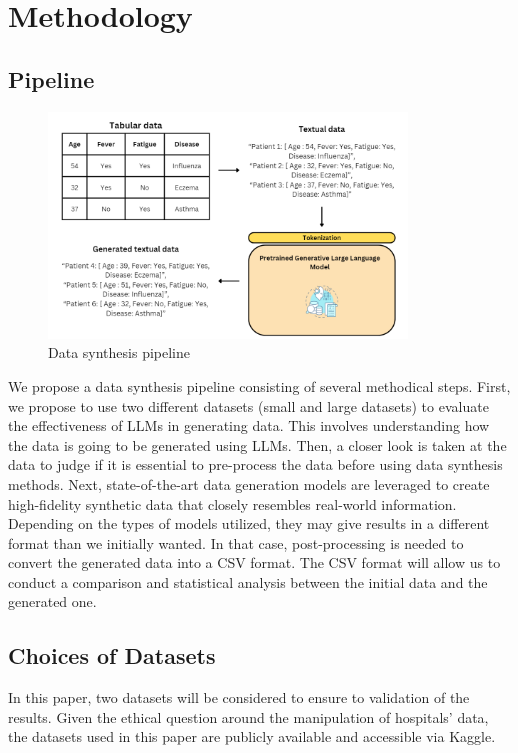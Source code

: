 \chapter{Methodology}

\section{Pipeline}

\begin{figure}[H]
    \centering
    \includegraphics[width=0.85\textwidth]{images/pipeline.png}
    \caption{Data synthesis pipeline}
    \label{fig:pipeline}
\end{figure}

We propose a data synthesis pipeline consisting of several methodical steps. First, we propose to use two different datasets (small and large datasets) to evaluate the effectiveness of LLMs in generating data. This involves understanding how the data is going to be generated using LLMs. Then, a closer look is taken at the data to judge if it is essential to pre-process the data before using data synthesis methods. Next, state-of-the-art data generation models are leveraged to create high-fidelity synthetic data that closely resembles real-world information. Depending on the types of models utilized, they may give results in a different format than we initially wanted. In that case, post-processing is needed to convert the generated data into a CSV format. The CSV format will allow us to conduct a comparison and statistical analysis between the initial data and the generated one.

\section{Choices of Datasets}

In this paper, two datasets will be considered to ensure to validation of the results.
Given the ethical question around the manipulation of hospitals' data, the datasets used in this paper are publicly available and accessible via Kaggle.

